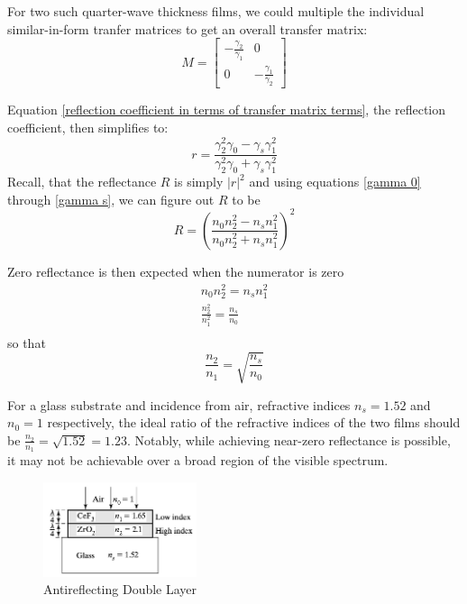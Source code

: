 For two such quarter-wave thickness films, we could multiple the individual similar-in-form tranfer matrices to get an overall transfer matrix:
\[
M = 
    \begin{bmatrix}
    -\frac{\gamma_2}{\gamma_1} & 0 \\
    0 & -\frac{\gamma_1}{\gamma_2}
  \end{bmatrix}
\]

Equation \ref{reflection coefficient in terms of transfer matrix terms}, the reflection coefficient, then simplifies to:
\begin{equation}\label{reflection coefficient for 2-layer antireflecting films}
r = \frac{\gamma_2^2\gamma_0 - \gamma_s\gamma_1^2}{\gamma_2^2\gamma_0 + \gamma_s\gamma_1^2}
\end{equation}
Recall, that the reflectance $R$ is simply $|r|^2$ and using equations \ref{gamma 0} through \ref{gamma s}, we can figure out $R$ to be
\begin{equation}\label{reflectance for 2-layer antireflecting films}
R = \left(\frac{n_0n_2^2 - n_sn_1^2}{n_0n_2^2 + n_sn_1^2}\right)^2
\end{equation}

Zero reflectance is then expected when the numerator is zero
\begin{align*}
    n_0n_2^2 = n_sn_1^2 \\
    \frac{n_2^2}{n_1^2} = \frac{n_s}{n_0}  \\
\end{align*} so that
\begin{equation}\label{zero reflectance criterion}
\frac{n_2}{n_1} = \sqrt{\frac{n_s}{n_0}}
\end{equation}

For a glass substrate and incidence from air, refractive indices $n_s = 1.52$ and $n_0 = 1$ respectively, the ideal ratio of the refractive indices of the two films should be $\frac{n_2}{n_1} = \sqrt{1.52} = 1.23$. Notably, while achieving near-zero reflectance is possible, it may not be achievable over a broad region of the visible spectrum.

\begin{figure}
  \centering
  \includegraphics[width=0.4\textwidth]{Chapters/Figures/Antireflecting Double Layer.jpeg}
  \caption{Antireflecting Double Layer}
\end{figure}

